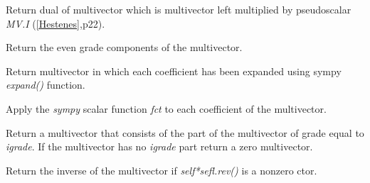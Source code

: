\documentclass[letterpaper,10pt,english]{sphinxmanual}
\begin{document}

\begin{fulllineitems}
\label{GA:dual}
Return dual of multivector which is multivector left multiplied by
pseudoscalar \emph{MV.I} ({\hyperref[GA:hestenes]{{[}Hestenes{]}}},p22).

\end{fulllineitems}


\begin{fulllineitems}
\label{GA:even}
Return the even grade components of the multivector.

\end{fulllineitems}


\begin{fulllineitems}
\label{GA:expand}
Return multivector in which each coefficient has been expanded using
sympy \emph{expand()} function.

\end{fulllineitems}


\begin{fulllineitems}
\label{GA:func}
Apply the \emph{sympy} scalar function \emph{fct} to each coefficient of the multivector.

\end{fulllineitems}


\begin{fulllineitems}
\label{GA:grade}
Return a multivector that consists of the part of the multivector of
grade equal to \emph{igrade}.  If the multivector has no \emph{igrade} part
return a zero multivector.

\end{fulllineitems}


\begin{fulllineitems}
\label{GA:inv}
Return the inverse of the multivector if \emph{self*sefl.rev()} is a nonzero ctor.

\end{fulllineitems}
\end{document}
